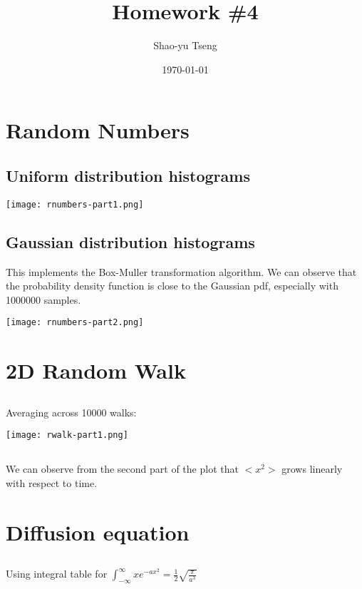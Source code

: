 \documentclass[10pt]{article}
\author{Shao-yu Tseng}
\date{\today}
\title{Homework \#4}
\begin{document}
\maketitle

\setlength\parindent{0pt}
\section{Random Numbers}

\subsection{Uniform distribution histograms}
\texttt{[image: rnumbers-part1.png]}
\subsection{Gaussian distribution histograms}
This implements the Box-Muller transformation algorithm.
We can observe that the probability density function is close to the Gaussian pdf, especially with 1000000 samples.

\texttt{[image: rnumbers-part2.png]}

\section{2D Random Walk}
\subsection{}
Averaging across 10000 walks:

\texttt{[image: rwalk-part1.png]}
\subsection{}
We can observe from the second part of the plot that \(<x^2>\) grows linearly with respect to time.

\section{Diffusion equation}
\subsection{}

Using integral table for  \(\int^{\infty}_{-\infty} x e^{-a x^{2}} = \frac{1}{2}\sqrt{\frac{\pi}{a^{3}}}\)
\end{document}
